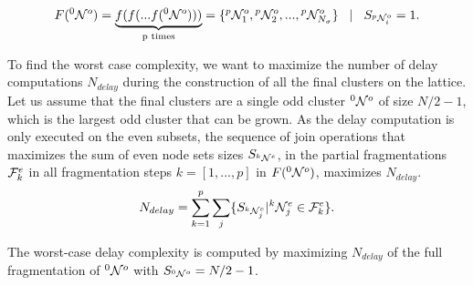 \begin{equation}\label{eq:fullfrag}
    F({}^{0}\mathcal{N}^o) = \underbrace{f(f(...f({}^{0}\mathcal{N}^o)))}_\text{p times} = \{{}^{p}\mathcal{N}^{o}_1, {}^{p}\mathcal{N}^{o}_2,...,{}^{p}\mathcal{N}^{o}_{N_\sigma} \} \hspace{.3cm} | \hspace{.3cm} S_{{}^{p}\mathcal{N}^{o}_i} = 1.
  \end{equation}

To find the worst case complexity, we want to maximize the number of delay computations $N_{delay}$ during the construction of all the final clusters on the lattice. Let us assume that the final clusters are a single odd cluster ${}^{0}\mathcal{N}^o$ of size $N/2-1$, which is the largest odd cluster that can be grown. As the delay computation is only executed on the even subsets, the sequence of join operations that maximizes the sum of even node sets sizes $S_{{}^{k}\mathcal{N}^e}$, in the partial fragmentations $\mathcal{F}^e_{k}$ in all fragmentation steps $k=[1,...,p]$ in $F({}^{0}\mathcal{N}^o)$, maximizes $N_{delay}$.
\begin{equation}\label{eq:maxdelay}
  N_{delay} = \sum_{k=1}^{p} \sum_j \{ S_{{}^{k}\mathcal{N}_j^e} | {}^{k}\mathcal{N}_j^e \in \mathcal{F}^e_k \}.
\end{equation}

\begin{proposition}
  The worst-case delay complexity is computed by maximizing $N_{delay}$ of the full fragmentation of ${}^{0}\mathcal{N}^o$ with $S_{{}^{0}\mathcal{N}^o} = N/2-1$.
\end{proposition}

